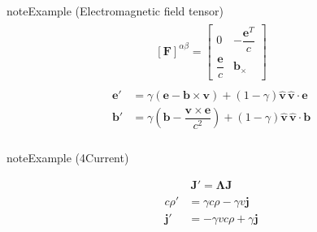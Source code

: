 \documentclass[letterpaper,10pt,english]{jupyterBook}
\begin{document}
\begin{sphinxadmonition}{note}{Example  (Electromagnetic field tensor)}
\begin{equation*}
\begin{split}
\begin{aligned}
  \left[\mathbf{F}\right]^{\alpha \beta} = \begin{bmatrix} 0 & - \dfrac{\mathbf{e}^T}{c} \\ \dfrac{\mathbf{e}}{c} & \mathbf{b}_{\times} \end{bmatrix} 
\end{aligned}\end{split}
\end{equation*}\begin{equation*}
\begin{split}\begin{aligned}
  \mathbf{e}' & = \gamma \left( \mathbf{e} -        \mathbf{b} \times \mathbf{v}       \right) + (1-\gamma) \hat{\mathbf{v}} \, \hat{\mathbf{v}} \cdot \mathbf{e} \\
  \mathbf{b}' & = \gamma \left( \mathbf{b} - \dfrac{\mathbf{v} \times \mathbf{e}}{c^2} \right) + (1 - \gamma) \hat{\mathbf{v}} \, \hat{\mathbf{v}} \cdot \mathbf{b} \\
\end{aligned}\end{split}
\end{equation*}\end{sphinxadmonition}
\label{None:example-2}
\begin{sphinxadmonition}{note}{Example  (4\sphinxhyphen{}Current)}


\begin{equation*}
\begin{split}\mathbf{J}' = \symbf{\Lambda} \mathbf{J}\end{split}
\end{equation*}\begin{equation*}
\begin{split}\begin{aligned}
  c \rho' & = \gamma c \rho - \gamma v \mathbf{j} \\
  \mathbf{j}' & = - \gamma v c \rho + \gamma \mathbf{j} 
\end{aligned}\end{split}
\end{equation*}\end{sphinxadmonition}
\label{None:example-3}
\end{document}
